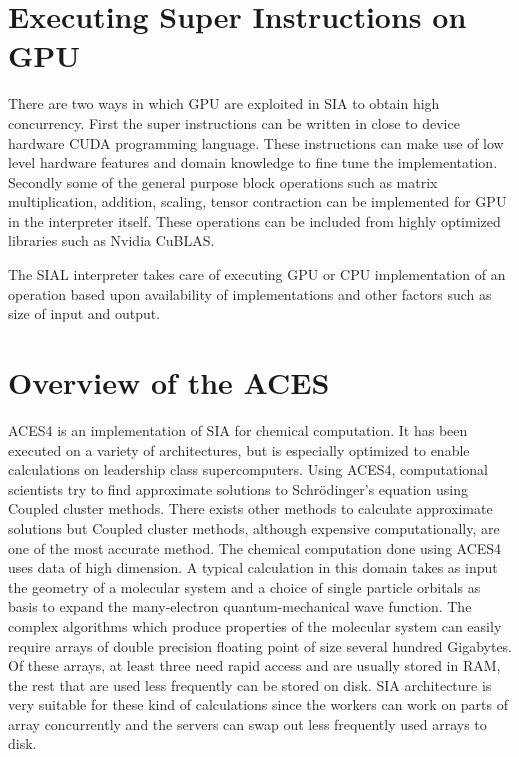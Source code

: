 \section{Executing Super Instructions on GPU}
There are two ways in which GPU are exploited in SIA to obtain high concurrency.
First the super instructions can be written in close to device hardware CUDA
programming language. These instructions can make use of low level hardware
features and domain knowledge to fine tune the implementation. Secondly some of
the general purpose block operations such as matrix multiplication, addition,
scaling, tensor contraction can be implemented for GPU in the interpreter
itself. These operations can be included from highly optimized libraries such as
Nvidia CuBLAS.

The SIAL interpreter takes care of executing GPU or CPU implementation of an
operation based upon availability of implementations and other factors such as
size of input and output.

\section{Overview of the ACES}
ACES4 is an implementation of SIA for chemical computation. It has been executed
on a variety of architectures, but is especially optimized to enable
calculations on leadership class supercomputers. Using ACES4, computational scientists
try to find approximate solutions to Schrödinger’s equation using Coupled cluster
methods. There exists other methods to calculate approximate solutions but Coupled
cluster methods, although expensive computationally, are one of the most accurate method.
The chemical computation done using ACES4 uses data of high dimension. A typical calculation in this domain
takes as input the geometry of a molecular system and a choice of single
particle orbitals as basis to expand the many-electron quantum-mechanical wave
function. The complex algorithms which produce properties of the molecular
system can easily require arrays of double precision floating point of size
several hundred Gigabytes. Of these arrays, at least three need rapid access and
are usually stored in RAM, the rest that are used less frequently can be stored
on disk. SIA architecture is very suitable for these kind of calculations since
the workers can work on parts of array concurrently and the servers can swap out
less frequently used arrays to disk.